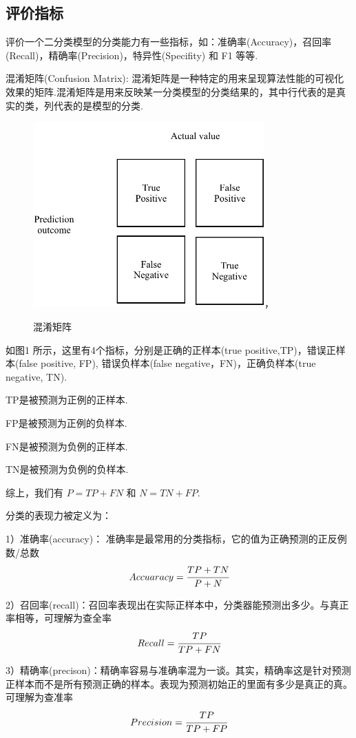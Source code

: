 \documentclass{njubachelor}
\begin{document}
\subsection{评价指标}
评价一个二分类模型的分类能力有一些指标，如：准确率(Accuracy)，召回率(Recall)，精确率(Precision)，特异性(Specifity) 和 F1 等等.

混淆矩阵(Confusion Matrix): 混淆矩阵是一种特定的用来呈现算法性能的可视化效果的矩阵.混淆矩阵是用来反映某一分类模型的分类结果的，其中行代表的是真实的类，列代表的是模型的分类.
\begin{figure}[!ht]
    \centering
    \includegraphics[width=3.5in]{pic/fig1}， 
    \caption{混淆矩阵}
\end{figure}

如图1 所示，这里有4个指标，分别是正确的正样本(true positive,TP)，错误正样本(false positive, FP), 错误负样本(false negative，FN)，正确负样本(true negative, TN).

TP是被预测为正例的正样本.

FP是被预测为正例的负样本.

FN是被预测为负例的正样本.

TN是被预测为负例的负样本.

综上，我们有 $P = TP + FN$ 和 $N = TN + FP$.

分类的表现力被定义为：

1）准确率(accuracy)：	准确率是最常用的分类指标，它的值为正确预测的正反例数/总数
$$Accuaracy = \cfrac{TP+TN}{P+N}$$                                 

2）召回率(recall)：召回率表现出在实际正样本中，分类器能预测出多少。与真正率相等，可理解为查全率
$$Recall = \cfrac{TP}{TP + FN}$$        

3）精确率(precison)：精确率容易与准确率混为一谈。其实，精确率这是针对预测正样本而不是所有预测正确的样本。表现为预测初始正的里面有多少是真正的真。可理解为查准率
$$Precision = \cfrac{TP}{TP+FP}$$
                                       
\end{document}
